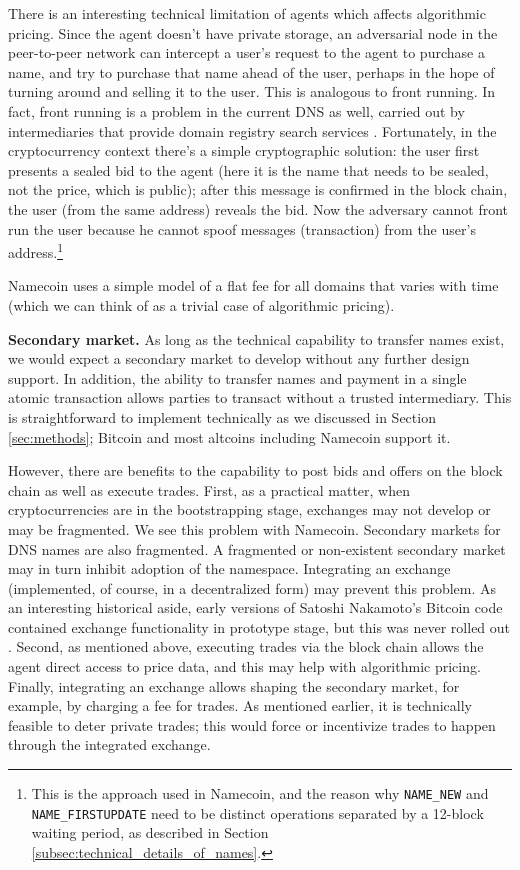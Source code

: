 There is an interesting technical limitation of agents which affects algorithmic pricing. Since the agent doesn't have private storage, an adversarial node in the peer-to-peer network can intercept a user's request to the agent to purchase a name, and try to purchase that name ahead of the user, perhaps in the hope of turning around and selling it to the user. This is analogous to front running. In fact, front running is a problem in the current DNS as well, carried out by intermediaries that provide domain registry search services \cite{}. Fortunately, in the cryptocurrency context there's a simple cryptographic solution: the user first presents a sealed bid to the agent (here it is the name that needs to be sealed, not the price, which is public); after this message is confirmed in the block chain, the user (from the same address) reveals the bid. Now the adversary cannot front run the user because he cannot spoof messages (transaction) from the user's address.\footnote{This is the approach used in Namecoin, and the reason why {\tt NAME\_NEW} and {\tt NAME\_FIRSTUPDATE} need to be distinct operations separated by a 12-block waiting period, as described in Section \ref{subsec:technical_details_of_names}.}


Namecoin uses a simple model of a flat fee for all domains that varies with time (which we can think of as a trivial case of algorithmic pricing).

{\bf Secondary market.} As long as the technical capability to transfer names exist, we would expect a secondary market to develop without any further design support. In addition, the ability to transfer names and payment in a single atomic transaction allows parties to transact without a trusted intermediary. This is straightforward to implement technically as we discussed in Section \ref{sec:methods}; Bitcoin and most altcoins including Namecoin support it. 

However, there are benefits to the capability to post bids and offers on the block chain as well as execute trades. First, as a practical matter, when cryptocurrencies are in the bootstrapping stage, exchanges may not develop or may be fragmented. We see this problem with Namecoin. Secondary markets for DNS names are also fragmented. A fragmented or non-existent secondary market may in turn inhibit adoption of the namespace. Integrating an exchange (implemented, of course, in a decentralized form) may prevent this problem. As an interesting historical aside, early versions of Satoshi Nakamoto's Bitcoin code contained exchange functionality in prototype stage, but this was never rolled out \cite{bitcoin}.  Second, as mentioned above, executing trades via the block chain allows the agent direct access to price data, and this may help with algorithmic pricing. Finally, integrating an exchange allows shaping the secondary market, for example, by charging a fee for trades. As mentioned earlier, it is technically feasible to deter private trades; this would force or incentivize trades to happen through the integrated exchange.

